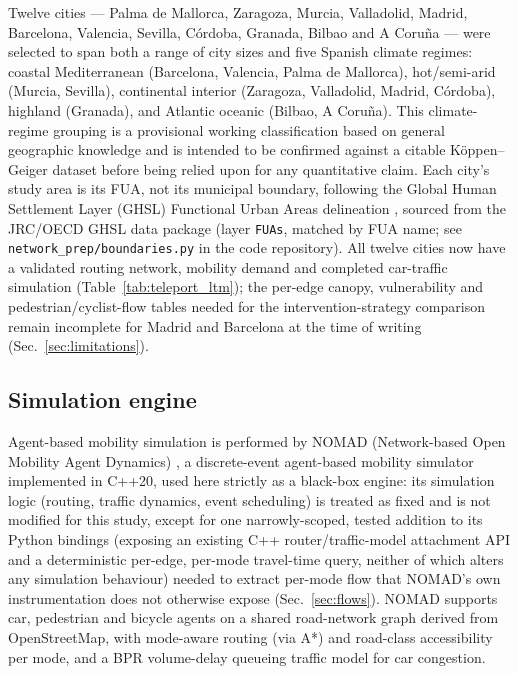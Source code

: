 \documentclass[pdflatex,sn-mathphys-ay]{sn-jnl}
\begin{document}
Twelve cities --- Palma de Mallorca, Zaragoza, Murcia, Valladolid, Madrid,
Barcelona, Valencia, Sevilla, C\'ordoba, Granada, Bilbao and A Coru\~na ---
were selected to span both a range of city sizes and five Spanish climate
regimes: coastal Mediterranean (Barcelona, Valencia, Palma de Mallorca),
hot/semi-arid (Murcia, Sevilla), continental interior (Zaragoza, Valladolid,
Madrid, C\'ordoba), highland (Granada), and Atlantic oceanic (Bilbao, A
Coru\~na). This climate-regime grouping is a provisional working
classification based on general geographic knowledge and is intended to be
confirmed against a citable K\"oppen--Geiger dataset before being relied upon
for any quantitative claim. Each city's study area is its FUA, not its
municipal boundary, following the Global Human Settlement Layer (GHSL)
Functional Urban Areas delineation \cite{ghsl_fua}, sourced from the JRC/OECD
GHSL data package (layer \texttt{FUAs}, matched by FUA name; see
\texttt{network\_prep/boundaries.py} in the code repository). All twelve
cities now have a validated routing network, mobility demand and completed
car-traffic simulation (Table~\ref{tab:teleport_ltm}); the per-edge canopy,
vulnerability and pedestrian/cyclist-flow tables needed for the
intervention-strategy comparison remain incomplete for Madrid and Barcelona
at the time of writing (Sec.~\ref{sec:limitations}).

\subsection{Simulation engine}
\label{sec:nomad}

Agent-based mobility simulation is performed by NOMAD (Network-based Open
Mobility Agent Dynamics) \cite{nomad2026}, a discrete-event agent-based
mobility simulator implemented in C++20, used here strictly as a
black-box engine: its simulation logic (routing, traffic dynamics, event
scheduling) is treated as fixed and is not modified for this study, except for
one narrowly-scoped, tested addition to its Python bindings (exposing an
existing C++ router/traffic-model attachment API and a deterministic
per-edge, per-mode travel-time query, neither of which alters any simulation
behaviour) needed to extract per-mode flow that NOMAD's own instrumentation
does not otherwise expose (Sec.~\ref{sec:flows}). NOMAD supports car,
pedestrian and bicycle agents on a shared road-network graph derived from
OpenStreetMap, with mode-aware routing (via A*) and road-class accessibility
per mode, and a BPR volume-delay queueing traffic model for car congestion.
\end{document}
